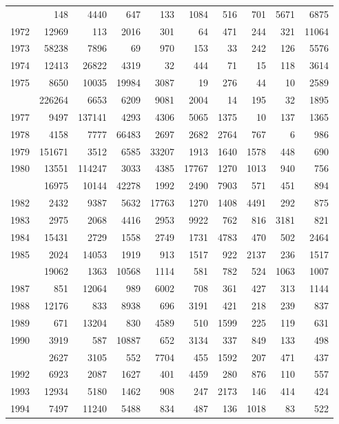 \documentclass[
]{article}
\begin{document}
\begin{longtable}[t]{lrrrrrrrrr}
\addlinespace
1971 & 148 & 4440 & 647 & 133 & 1084 & 516 & 701 & 5671 & 6875\\
1972 & 12969 & 113 & 2016 & 301 & 64 & 471 & 244 & 321 & 11064\\
1973 & 58238 & 7896 & 69 & 970 & 153 & 33 & 242 & 126 & 5576\\
1974 & 12413 & 26822 & 4319 & 32 & 444 & 71 & 15 & 118 & 3614\\
1975 & 8650 & 10035 & 19984 & 3087 & 19 & 276 & 44 & 10 & 2589\\
\addlinespace
1976 & 226264 & 6653 & 6209 & 9081 & 2004 & 14 & 195 & 32 & 1895\\
1977 & 9497 & 137141 & 4293 & 4306 & 5065 & 1375 & 10 & 137 & 1365\\
1978 & 4158 & 7777 & 66483 & 2697 & 2682 & 2764 & 767 & 6 & 986\\
1979 & 151671 & 3512 & 6585 & 33207 & 1913 & 1640 & 1578 & 448 & 690\\
1980 & 13551 & 114247 & 3033 & 4385 & 17767 & 1270 & 1013 & 940 & 756\\
\addlinespace
1981 & 16975 & 10144 & 42278 & 1992 & 2490 & 7903 & 571 & 451 & 894\\
1982 & 2432 & 9387 & 5632 & 17763 & 1270 & 1408 & 4491 & 292 & 875\\
1983 & 2975 & 2068 & 4416 & 2953 & 9922 & 762 & 816 & 3181 & 821\\
1984 & 15431 & 2729 & 1558 & 2749 & 1731 & 4783 & 470 & 502 & 2464\\
1985 & 2024 & 14053 & 1919 & 913 & 1517 & 922 & 2137 & 236 & 1517\\
\addlinespace
1986 & 19062 & 1363 & 10568 & 1114 & 581 & 782 & 524 & 1063 & 1007\\
1987 & 851 & 12064 & 989 & 6002 & 708 & 361 & 427 & 313 & 1144\\
1988 & 12176 & 833 & 8938 & 696 & 3191 & 421 & 218 & 239 & 837\\
1989 & 671 & 13204 & 830 & 4589 & 510 & 1599 & 225 & 119 & 631\\
1990 & 3919 & 587 & 10887 & 652 & 3134 & 337 & 849 & 133 & 498\\
\addlinespace
1991 & 2627 & 3105 & 552 & 7704 & 455 & 1592 & 207 & 471 & 437\\
1992 & 6923 & 2087 & 1627 & 401 & 4459 & 280 & 876 & 110 & 557\\
1993 & 12934 & 5180 & 1462 & 908 & 247 & 2173 & 146 & 414 & 424\\
1994 & 7497 & 11240 & 5488 & 834 & 487 & 136 & 1018 & 83 & 522\\

\end{longtable}
\end{document}
